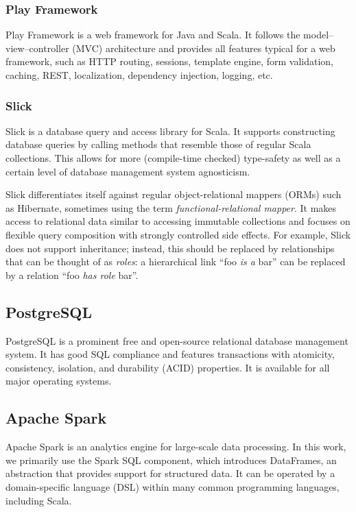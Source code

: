 \subsubsection{Play Framework}
Play Framework is a web framework for Java and Scala.
It follows the model--view--controller (MVC) architecture and provides all features typical for a web framework, such as  HTTP routing, sessions, template engine, form validation, caching, REST, localization, dependency injection, logging, etc.


\subsubsection{Slick}
Slick is a database query and access library for Scala.
It supports constructing database queries by calling methods that resemble those of regular Scala collections.
This allows for more (compile-time checked) type-safety as well as a certain level of database management system agnosticism.

Slick differentiates itself against regular object-relational mappers (ORMs) such as Hibernate, sometimes using the term \textit{functional-relational mapper}.
It makes access to relational data similar to accessing immutable collections and focuses on flexible query composition with strongly controlled side effects.
For example, Slick does not support inheritance; instead, this should be replaced by relationships that can be thought of as \textit{roles}: a hierarchical link \enquote{foo \textit{is a} bar} can be replaced by a relation \enquote{foo \textit{has role} bar}. \cite{Slick}

\subsection{PostgreSQL}
PostgreSQL is a prominent free and open-source relational database management system.
It has good SQL compliance and features transactions with atomicity, consistency, isolation, and durability (ACID) properties.
It is available for all major operating systems.

\subsection{Apache Spark}
Apache Spark is an analytics engine for large-scale data processing.
In this work, we primarily use the Spark SQL component, which introduces DataFrames, an abstraction that provides support for structured data.
It can be operated by a domain-specific language (DSL) within many common programming languages, including Scala.

